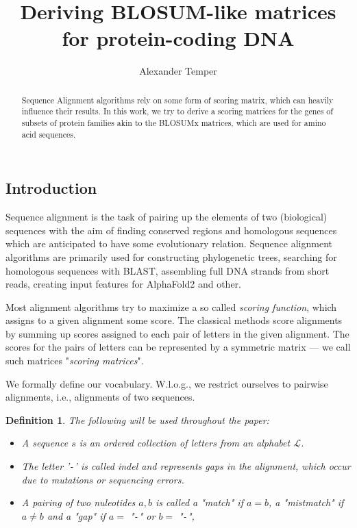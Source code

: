 \documentclass{article}
\title{Deriving BLOSUM-like matrices for protein-coding DNA}
\author{Alexander Temper}
\newtheorem{definition}{Definition}
\begin{document}
\maketitle

\begin{abstract}
    Sequence Alignment algorithms rely on some form of scoring matrix,
    which can heavily influence their results. In this work, we try to derive a
    scoring matrices for the genes of subsets of protein families akin to
    the BLOSUMx matrices, which are used for amino acid sequences.
\end{abstract}

\begin{multicols}{2}
	
\section*{Introduction} Sequence alignment is the task of pairing up the
elements of two (biological) sequences with the aim of finding conserved
regions and homologous sequences which are anticipated to have some
evolutionary relation. Sequence alignment algorithms are primarily used for
constructing phylogenetic trees, searching for homologous sequences with BLAST,
assembling full DNA strands from short reads, creating input features for
AlphaFold2 and other.

Most alignment algorithms try to maximize a so called \emph{scoring function},
which assigns to a given alignment some score. The classical methods score
alignments by summing up scores assigned to each pair of letters in the given
alignment. The scores for the pairs of letters can be represented by a
symmetric matrix --- we call such matrices "\emph{scoring matrices}".

We formally define our vocabulary. W.l.o.g., we restrict ourselves to pairwise
alignments, i.e., alignments of two sequences.

\begin{definition}
    The following will be used throughout the paper:
    \begin{itemize}
        \item A \emph{sequence} $s$ is an ordered collection of letters from
              an alphabet $\mathcal{L}$.
        \item The letter '\texttt{-}' is called \emph{indel} and represents
              gaps in the alignment, which occur due to mutations or sequencing
              errors.
      \item A pairing of two nuleotides $a, b$ is called a "\emph{match}" if $a = b$, a "\emph{mistmatch"} if $a \ne b$ and a "\emph {gap}" if $a =$ "\texttt{-}" or $b =$ "\texttt{-}",


\end{itemize}
\end{definition}
\end{multicols}
\end{document}
